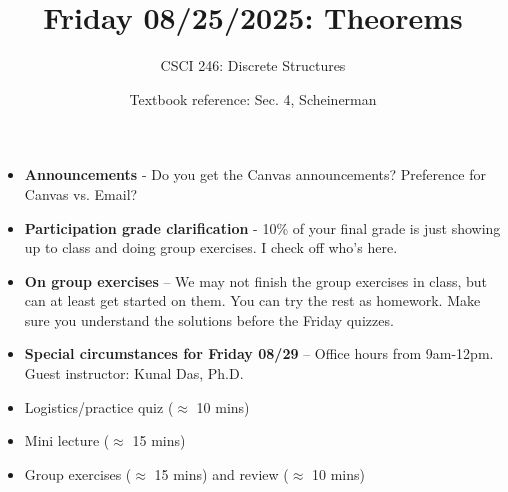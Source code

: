 \documentclass[10pt]{beamer}
\begin{document}
\title{Friday 08/25/2025: Theorems}
\author{CSCI 246: Discrete Structures}
\date{Textbook reference: Sec. 4, Scheinerman}


\begin{frame}
    \titlepage 
\end{frame}


\begin{frame}

\begin{mygreenbox}[title=Logistical Matters]
\begin{itemize}
\item \textbf{Announcements} - Do you get the Canvas announcements?  Preference for Canvas vs. Email?
\item \textbf{Participation grade clarification} - 10\% of your final grade is just showing up to class and doing group exercises.  I check off who's here.
\item \textbf{On group exercises} -- We may not finish the group exercises in class, but can at least get started on them.  You can try the rest as homework.  Make sure you understand the solutions before the Friday quizzes.
\item \textbf{Special circumstances for Friday 08/29} -- Office hours from 9am-12pm.  Guest instructor: Kunal Das, Ph.D.
\end{itemize}

\end{mygreenbox}

\vfill 


\begin{myyellowbox}[title=Today's Agenda]
\begin{itemize}
	\item Logistics/practice quiz ($\approx$ 10 mins)
	\item Mini lecture ($\approx$ 15 mins)
	\item Group exercises ($\approx$ 15 mins) and review ($\approx$ 10 mins)
\end{itemize}


\end{myyellowbox}
\vfill 

\end{frame}
\end{document}
